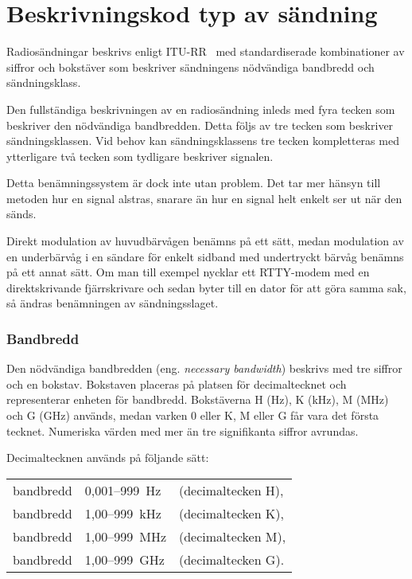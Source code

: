 \chapter{Beskrivningskod typ av sändning}
\label{sändslag}

Radiosändningar beskrivs enligt ITU-RR~\cite[Appendix 1]{ITU-RR} med
standardiserade kombinationer av siffror och bokstäver som beskriver
sändningens nödvändiga bandbredd och sändningsklass.

Den fullständiga beskrivningen av en radiosändning inleds med fyra tecken
som beskriver den nödvändiga bandbredden.
Detta följs av tre tecken som beskriver sändningsklassen.
Vid behov kan sändningsklassens tre tecken kompletteras med ytterligare två
tecken som tydligare beskriver signalen.

Detta benämningssystem är dock inte utan problem.
Det tar mer hänsyn till metoden hur en signal alstras, snarare än hur en signal
helt enkelt ser ut när den sänds.

Direkt modulation av huvudbärvågen benämns på ett sätt, medan modulation
av en underbärvåg i en sändare för enkelt sidband med undertryckt bärvåg
benämns på ett annat sätt.
Om man till exempel nycklar ett RTTY-modem med en direktskrivande fjärrskrivare och
sedan byter till en dator för att göra samma sak, så ändras benämningen av
sändningsslaget.

\subsection{Bandbredd}

Den nödvändiga bandbredden (eng. \emph{necessary bandwidth}) beskrivs med
tre siffror och en bokstav.
Bokstaven placeras på platsen för decimaltecknet och representerar enheten för
bandbredd.
Bokstäverna H (Hz), K (kHz), M (MHz) och G (GHz) används, medan varken 0 eller
K, M eller G får vara det första tecknet.
Numeriska värden med mer än tre signifikanta siffror avrundas.

Decimaltecknen används på följande sätt:\\
\begin{tabular}{lll}
	bandbredd & 0,001--999~Hz & (decimaltecken H),\\
	bandbredd & 1,00--999~kHz & (decimaltecken K),\\
	bandbredd & 1,00--999~MHz & (decimaltecken M),\\
	bandbredd & 1,00--999~GHz & (decimaltecken G).\\
\end{tabular}

